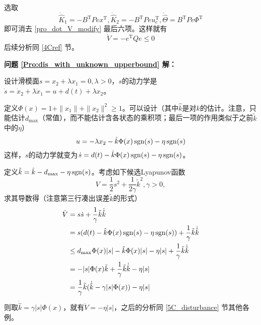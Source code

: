 选取
\[\dot{\hat{K}} _1 = -  B^\mathrm{T}  P  e  x^\mathrm{T}, \dot{\hat{K}} _2 = -  B^\mathrm{T}  P  e  u^\mathrm{T}_c,\dot{\hat{\Theta}}=B^\mathrm{T}Pe\Phi^\mathrm{T}\]
即可消去 \eqref{pro_dot_V_modify} 最后六项。这样就有
\[ \dot{V} = - e^\mathrm{T} Q  e \leq 0 \]
后续分析同 \ref{4Cref} 节。

\noindent\textcolor{winered}{\textbf{问题 \ref{Pro:dis_with_unknown_upperbound} 解：}}

设计滑模面$s = x_2 + \lambda x_1 = 0,  \lambda > 0$，$s$的动力学是 $\dot{s} = \dot{x}_2 + \lambda \dot{x}_1 = u + d (t)
  + \lambda x_2$。

定义$\Phi(x)=1 + \| x_1 \| + \| x_2 \|^2\ge 1$。可以设计（其中$\hat{k}$是对$k$的估计。注意，只能估计$d_{\max}$（常值），而不能估计含各状态的乘积项；最后一项的作用类似于之前$\tilde{k}$中的$\eta$）
  \[ u = - \lambda x_2 - \hat{k}\Phi(x) \operatorname{sgn} (s) -\eta\operatorname{sgn}(s)\]
这样，$s$的动力学就变为$\dot{s}=d(t)-\hat{k}\Phi(x) \operatorname{sgn} (s)-\eta\operatorname{sgn}(s)$。

定义$\tilde{k}=\hat{k}-d_{\max}-\eta\operatorname{sgn}(s)$。考虑如下候选Lyapunov函数
  \[ V = \frac{1}{2} s^2 + \frac{1}{2 \gamma} \tilde{k}^2, \gamma > 0, \]
  求其导数得（注意第三行凑出误差$\tilde{k}$的形式）
  \begin{align*}
    \dot{V} & = s  \dot{s} + \frac{1}{\gamma} \tilde{k} \dot{\hat{k}}\\
    &=s(d(t)-\hat{k}\Phi(x)\operatorname{sgn}(s)-\eta\operatorname{sgn}(s))+\frac{1}{\gamma} \tilde{k} \dot{\hat{k}}\\
    & \leq d_{\max}\Phi(x)|s|-\hat{k}\Phi(x)|s|-\eta|s|+\frac{1}{\gamma} \tilde{k} \dot{\hat{k}}\\
    & = -|s|\Phi(x)\tilde{k}+\frac{1}{\gamma} \tilde{k} \dot{\hat{k}}-\eta|s|\\
    &= \frac{1}{\gamma}\tilde{k} (\dot{\hat{k}}-\gamma |s|\Phi(x))-\eta|s|
  \end{align*}
则取$\dot{\hat{k}}=\gamma |s|\Phi(x)$，就有$\dot{V}=-\eta|s|$，之后的分析同 \ref{5C_disturbance} 节其他各例。

